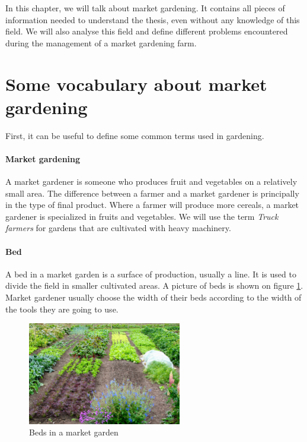 
In this chapter, we will talk about market gardening. It contains all pieces of information needed to understand the thesis, even without any knowledge of this field. We will also analyse this field and define different problems encountered during the management of a market gardening farm.

\section{Some vocabulary about market gardening}
First, it can be useful to define some common terms used in gardening.
\paragraph{Market gardening} A market gardener is someone who produces fruit and vegetables on a relatively small area. The difference between a farmer and a market gardener is principally in the type of final product. Where a farmer will produce more cereals, a market gardener is specialized in fruits and vegetables. We will use the term \emph{Truck farmers} for gardens that are cultivated with heavy machinery.  


\paragraph{Bed} A bed in a market garden is a surface of production, usually a line. It is used to divide the field in smaller cultivated areas. A picture of beds is shown on figure \ref{fig:beds}. Market gardener usually choose the width of their beds according to the width of the tools they are going to use.

\begin{figure}
    \centering
    \includegraphics[width=0.6\textwidth]{images/beds.jpg}
    \caption{Beds in a market garden}
    \label{fig:beds}
\end{figure}

